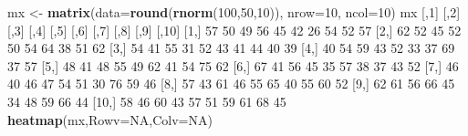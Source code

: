 \documentclass[
]{book}
\newenvironment{Shaded}{\begin{snugshade}}{\end{snugshade}}
\newcommand{\DataTypeTok}[1]{\textcolor[rgb]{0.13,0.29,0.53}{#1}}
\newcommand{\DecValTok}[1]{\textcolor[rgb]{0.00,0.00,0.81}{#1}}
\newcommand{\KeywordTok}[1]{\textcolor[rgb]{0.13,0.29,0.53}{\textbf{#1}}}
\newcommand{\NormalTok}[1]{#1}
\newcommand{\OtherTok}[1]{\textcolor[rgb]{0.56,0.35,0.01}{#1}}
\newcommand{\StringTok}[1]{\textcolor[rgb]{0.31,0.60,0.02}{#1}}
\begin{document}
\begin{Shaded}
\begin{Highlighting}[]
\NormalTok{mx <-}\StringTok{ }\KeywordTok{matrix}\NormalTok{(}\DataTypeTok{data=}\KeywordTok{round}\NormalTok{(}\KeywordTok{rnorm}\NormalTok{(}\DecValTok{100}\NormalTok{,}\DecValTok{50}\NormalTok{,}\DecValTok{10}\NormalTok{)),}
             \DataTypeTok{nrow=}\DecValTok{10}\NormalTok{,}
             \DataTypeTok{ncol=}\DecValTok{10}\NormalTok{)}
\NormalTok{mx}
\NormalTok{      [,}\DecValTok{1}\NormalTok{] [,}\DecValTok{2}\NormalTok{] [,}\DecValTok{3}\NormalTok{] [,}\DecValTok{4}\NormalTok{] [,}\DecValTok{5}\NormalTok{] [,}\DecValTok{6}\NormalTok{] [,}\DecValTok{7}\NormalTok{] [,}\DecValTok{8}\NormalTok{] [,}\DecValTok{9}\NormalTok{] [,}\DecValTok{10}\NormalTok{]}
\NormalTok{ [}\DecValTok{1}\NormalTok{,]   }\DecValTok{57}   \DecValTok{50}   \DecValTok{49}   \DecValTok{56}   \DecValTok{45}   \DecValTok{42}   \DecValTok{26}   \DecValTok{54}   \DecValTok{52}    \DecValTok{57}
\NormalTok{ [}\DecValTok{2}\NormalTok{,]   }\DecValTok{62}   \DecValTok{52}   \DecValTok{45}   \DecValTok{52}   \DecValTok{50}   \DecValTok{54}   \DecValTok{64}   \DecValTok{38}   \DecValTok{51}    \DecValTok{62}
\NormalTok{ [}\DecValTok{3}\NormalTok{,]   }\DecValTok{54}   \DecValTok{41}   \DecValTok{55}   \DecValTok{31}   \DecValTok{52}   \DecValTok{43}   \DecValTok{41}   \DecValTok{44}   \DecValTok{40}    \DecValTok{39}
\NormalTok{ [}\DecValTok{4}\NormalTok{,]   }\DecValTok{40}   \DecValTok{54}   \DecValTok{59}   \DecValTok{43}   \DecValTok{52}   \DecValTok{33}   \DecValTok{37}   \DecValTok{69}   \DecValTok{37}    \DecValTok{57}
\NormalTok{ [}\DecValTok{5}\NormalTok{,]   }\DecValTok{48}   \DecValTok{41}   \DecValTok{48}   \DecValTok{55}   \DecValTok{49}   \DecValTok{62}   \DecValTok{41}   \DecValTok{54}   \DecValTok{75}    \DecValTok{62}
\NormalTok{ [}\DecValTok{6}\NormalTok{,]   }\DecValTok{67}   \DecValTok{41}   \DecValTok{56}   \DecValTok{45}   \DecValTok{35}   \DecValTok{57}   \DecValTok{38}   \DecValTok{37}   \DecValTok{43}    \DecValTok{52}
\NormalTok{ [}\DecValTok{7}\NormalTok{,]   }\DecValTok{46}   \DecValTok{40}   \DecValTok{46}   \DecValTok{47}   \DecValTok{54}   \DecValTok{51}   \DecValTok{30}   \DecValTok{76}   \DecValTok{59}    \DecValTok{46}
\NormalTok{ [}\DecValTok{8}\NormalTok{,]   }\DecValTok{57}   \DecValTok{43}   \DecValTok{61}   \DecValTok{46}   \DecValTok{55}   \DecValTok{65}   \DecValTok{40}   \DecValTok{55}   \DecValTok{60}    \DecValTok{52}
\NormalTok{ [}\DecValTok{9}\NormalTok{,]   }\DecValTok{62}   \DecValTok{61}   \DecValTok{56}   \DecValTok{66}   \DecValTok{45}   \DecValTok{34}   \DecValTok{48}   \DecValTok{59}   \DecValTok{66}    \DecValTok{44}
\NormalTok{[}\DecValTok{10}\NormalTok{,]   }\DecValTok{58}   \DecValTok{46}   \DecValTok{60}   \DecValTok{43}   \DecValTok{57}   \DecValTok{51}   \DecValTok{59}   \DecValTok{61}   \DecValTok{68}    \DecValTok{45}
\KeywordTok{heatmap}\NormalTok{(mx,}\DataTypeTok{Rowv=}\OtherTok{NA}\NormalTok{,}\DataTypeTok{Colv=}\OtherTok{NA}\NormalTok{)}
\end{Highlighting}
\end{Shaded}
\end{document}
